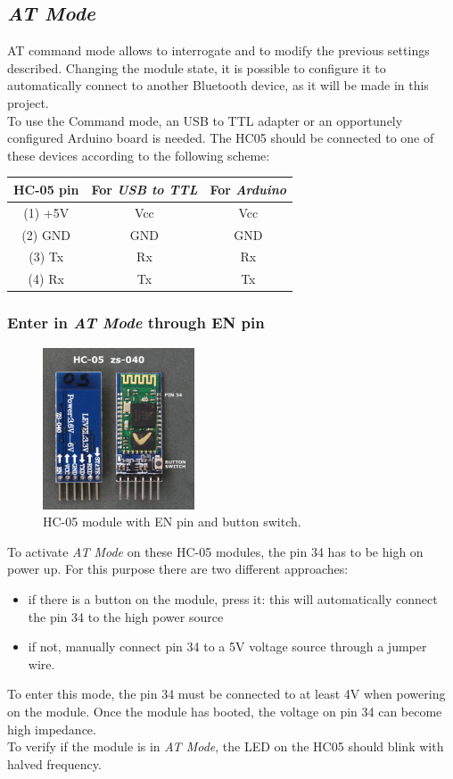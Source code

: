 \subsection{\textit{AT Mode}}
AT command mode allows to interrogate and to modify the previous settings described. Changing the module state, it is possible to configure it to automatically connect to another Bluetooth device, as it will be made in this project.\\
To use the Command mode, an USB to TTL adapter or an opportunely configured Arduino board is needed. The HC05 should be connected to one of these devices according to the following scheme:\\

\begin{tabular}{|c|c|c|}
	\hline 
	\textbf{HC-05 pin} & \textbf{For \textit{USB to TTL}} & \textbf{For \textit{Arduino}} \\ 
	\hline 
	(1) +5V & Vcc & Vcc \\ 
	\hline 
	(2) GND & GND & GND \\ 
	\hline 
	(3) Tx & Rx & Rx \\ 
	\hline 
	(4) Rx & Tx & Tx \\ 
	\hline 
\end{tabular}

\subsubsection{Enter in \textit{AT Mode} through EN pin}
\begin{figure}[H]
	\hspace*{0.3 \textwidth}\includegraphics[width= 0.4\textwidth]
	{files/images/hc05_en_pin}
	\caption{HC-05 module with EN pin and button switch.}
\end{figure}
To activate \textit{AT Mode} on these HC-05 modules, the pin 34 has to be high on power up. For this purpose there are two different approaches: \begin{itemize}
\item if there is a button on the module, press it: this will automatically connect the pin 34 to the high power source
\item if not, manually connect pin 34 to a 5V voltage source through a jumper wire.
\end{itemize}
To enter this mode, the pin 34 must be connected to at least 4V when powering on the module. Once the module has booted, the voltage on pin 34 can become high impedance.\\
To verify if the module is in \textit{AT Mode}, the LED on the HC05 should blink with halved frequency.

